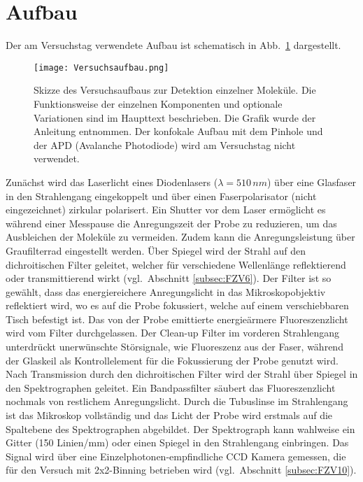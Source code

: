 \section{\label{sec:aufbau}Aufbau}
Der am Versuchstag verwendete Aufbau ist schematisch in Abb.~\ref{fig:aufbau} dargestellt.
\begin{figure}[h!]
    \centering
    \texttt{[image: Versuchsaufbau.png]}
    \caption{\label{fig:aufbau}Skizze des Versuchsaufbaus zur Detektion einzelner Moleküle.
        Die Funktionsweise der einzelnen Komponenten und optionale Variationen sind im Haupttext beschrieben.
        Die Grafik wurde der Anleitung \cite{Anleitung} entnommen.
        Der konfokale Aufbau mit dem Pinhole und der APD (Avalanche Photodiode)
        wird am Versuchstag nicht verwendet.}
\end{figure} \FloatBarrier
Zunächst wird das Laserlicht eines Diodenlasers ($\lambda = 510\,\si{nm}$) über eine Glasfaser
in den Strahlengang eingekoppelt und über einen Faserpolarisator (nicht eingezeichnet) zirkular polarisert.
Ein Shutter vor dem Laser ermöglicht es während einer Messpause die Anregungszeit der
Probe zu reduzieren, um das Ausbleichen der Moleküle zu vermeiden. Zudem kann die Anregungsleistung über Graufilterrad
eingestellt werden. Über Spiegel wird der Strahl auf den dichroitischen Filter geleitet, welcher für verschiedene
Wellenlänge reflektierend oder transmittierend wirkt (vgl.~Abschnitt \ref{subsec:FZV6}). Der Filter ist so gewählt,
dass das energiereichere Anregungslicht in das Mikroskopobjektiv reflektiert wird, wo es auf die Probe
fokussiert, welche auf einem verschiebbaren Tisch befestigt ist. Das von der Probe emittierte energieärmere
Fluoreszenzlicht wird vom Filter durchgelassen.
Der Clean-up Filter im vorderen Strahlengang unterdrückt unerwünschte Störsignale, wie Fluoreszenz aus der
Faser, während der Glaskeil als Kontrollelement für die Fokussierung der Probe genutzt wird. \\
Nach Transmission durch den dichroitischen Filter wird der Strahl über Spiegel in den Spektrographen geleitet.
Ein Bandpassfilter säubert das Fluoreszenzlicht nochmals von restlichem Anregungslicht. Durch die Tubuslinse im
Strahlengang ist das Mikroskop vollständig und das Licht der Probe
wird erstmals auf die Spaltebene des Spektrographen abgebildet. Der Spektrograph kann
wahlweise ein Gitter (150 Linien/mm) oder einen Spiegel in den Strahlengang einbringen.
Das Signal wird über eine Einzelphotonen-empfindliche CCD Kamera gemessen, die für den Versuch mit
2x2-Binning betrieben wird (vgl.~Abschnitt \ref{subsec:FZV10}). \\
